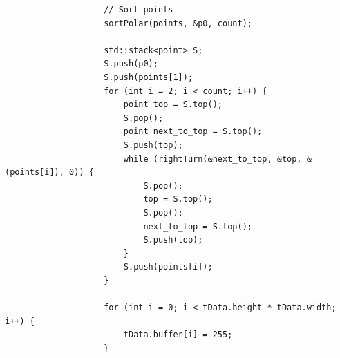\documentclass{report}
\begin{document}
\begin{lstlisting}
                    // Sort points
                    sortPolar(points, &p0, count);

                    std::stack<point> S;
                    S.push(p0);
                    S.push(points[1]);
                    for (int i = 2; i < count; i++) {
                        point top = S.top();
                        S.pop();
                        point next_to_top = S.top();
                        S.push(top);
                        while (rightTurn(&next_to_top, &top, &(points[i]), 0)) {
                            S.pop();
                            top = S.top();
                            S.pop();
                            next_to_top = S.top();
                            S.push(top);
                        }
                        S.push(points[i]);
                    }

                    for (int i = 0; i < tData.height * tData.width; i++) {
                        tData.buffer[i] = 255;
                    }


\end{lstlisting}
\end{document}
